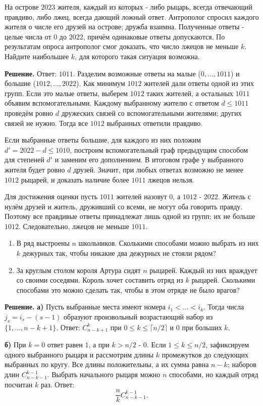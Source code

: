 \begin{problems}
\item На острове $2023$ жителя, каждый из которых - либо рыцарь,
всегда отвечающий правдиво, либо лжец, всегда дающий ложный ответ.
Антрополог спросил каждого жителя о числе его друзей на острове;
дружба взаимна. Полученные ответы - целые числа от $0$ до $2022$,
причём одинаковые ответы допускаются. По результатам опроса антрополог
смог доказать, что число лжецов не меньше $k$. Найдите наибольшее $k$,
для которого такая ситуация возможна.
\par\smallskip\noindent\textbf{Решение.} Ответ: $1011$. Разделим возможные ответы на малые ($0,\ldots,1011$) и большие ($1012,\ldots,2022$). Как минимум $1012$ жителей дали ответы одной из этих групп. Если это малые ответы, выберем $1012$ таких жителей, а остальных $1011$ объявим вспомогательными. Каждому выбранному жителю с ответом $d\le1011$ проведём ровно $d$ дружеских связей со вспомогательными жителями; других связей не нужно. Тогда все $1012$ выбранных ответили правдиво.
\par Если выбранные ответы большие, для каждого из них положим $d'=2022-d\le1010$, построим вспомогательный граф предыдущим способом для степеней $d'$ и заменим его дополнением. В итоговом графе у выбранного жителя будет ровно $d$ друзей. Значит, при любых ответах возможно не менее $1012$ рыцарей, и доказать наличие более $1011$ лжецов нельзя.
\par Для достижения оценки пусть $1011$ жителей назовут $0$, а $1012$ - $2022$. Житель с нулём друзей и житель, друживший со всеми, не могут оба говорить правду. Поэтому все правдивые ответы принадлежат лишь одной из групп; их не больше $1012$. Следовательно, лжецов не меньше $1011$.\par

\item
\begin{enumerate}
  \item[а)] В ряд выстроены $n$ школьников. Сколькими способами можно выбрать из них $k$ дежурных так, чтобы никакие два дежурных не стояли рядом?
  \item[б)] За круглым столом короля Артура сидят $n$ рыцарей. Каждый из них враждует со своими соседями. Король хочет составить отряд из $k$ рыцарей. Сколькими способами это можно сделать так, чтобы в этом отряде не было врагов?
\end{enumerate}
\par\smallskip\noindent\textbf{Решение.} \textbf{а)} Пусть выбранные места имеют номера $i_1<\dots<i_k$. Тогда числа $j_s=i_s-(s-1)$ образуют произвольный возрастающий набор из $\{1,\ldots,n-k+1\}$. Ответ: $C_{n-k+1}^k$ при $0\le k\le\lceil n/2\rceil$ и $0$ при больших $k$.
\par\textbf{б)} При $k=0$ ответ равен $1$, а при $k>n/2$ - $0$. Если $1\le k\le n/2$, зафиксируем одного выбранного рыцаря и рассмотрим длины $k$ промежутков до следующих выбранных по кругу. Все длины положительны, а их сумма равна $n-k$; наборов длин $C_{n-k-1}^{k-1}$. Выбрать начального рыцаря можно $n$ способами, но каждый отряд посчитан $k$ раз. Ответ:
\[
\frac{n}{k}C_{n-k-1}^{k-1}.
\]\par


\end{problems}
